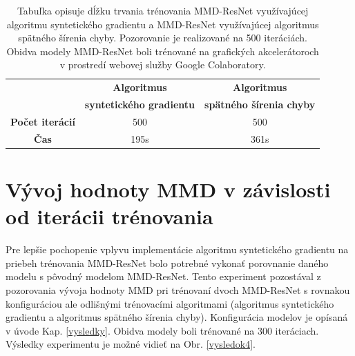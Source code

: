 \begin{table}[h!]
\caption[Trénovanie MMD-ResNet na grafických akcelerátoroch]{Tabuľka opisuje dĺžku trvania trénovania MMD-ResNet využívajúcej algoritmu syntetického gradientu a MMD-ResNet využívajúcej algoritmus spätného šírenia chyby. Pozorovanie je realizované na 500 iteráciách. Obidva modely MMD-ResNet boli trénované na grafických akcelerátoroch v prostredí webovej služby Google Colaboratory.}
\label{vysledok3}
\begin{center}
\begin{tabular}{|c|c|c|}
\hline
  & \textbf{Algoritmus} & \textbf{Algoritmus} \\
  & \textbf{syntetického gradientu} & \textbf{spätného šírenia chyby} \\
\hline
\textbf{Počet iterácií} & 500 & 500 \\
\hline
\textbf{Čas} & 195s & 361s \\
\hline
\end{tabular}%
\end{center}
\end{table}

\section{Vývoj hodnoty MMD v závislosti od iterácii trénovania}
\label{vyvoj_MMD_v_iteraciach}

Pre lepšie pochopenie vplyvu implementácie algoritmu syntetického gradientu na priebeh trénovania MMD-ResNet bolo potrebné vykonať porovnanie daného modelu s pôvodný modelom MMD-ResNet. Tento experiment pozostával z pozorovania vývoja hodnoty MMD pri trénovaní dvoch MMD-ResNet s rovnakou konfiguráciou ale odlišnými trénovacími algoritmami (algoritmus syntetického gradientu a algoritmus spätného šírenia chyby). Konfigurácia modelov je opísaná v úvode Kap. \ref{vysledky}. Obidva modely boli trénované na 300 iteráciach. Výsledky experimentu je možné vidieť na Obr. \ref{vysledok4}.

